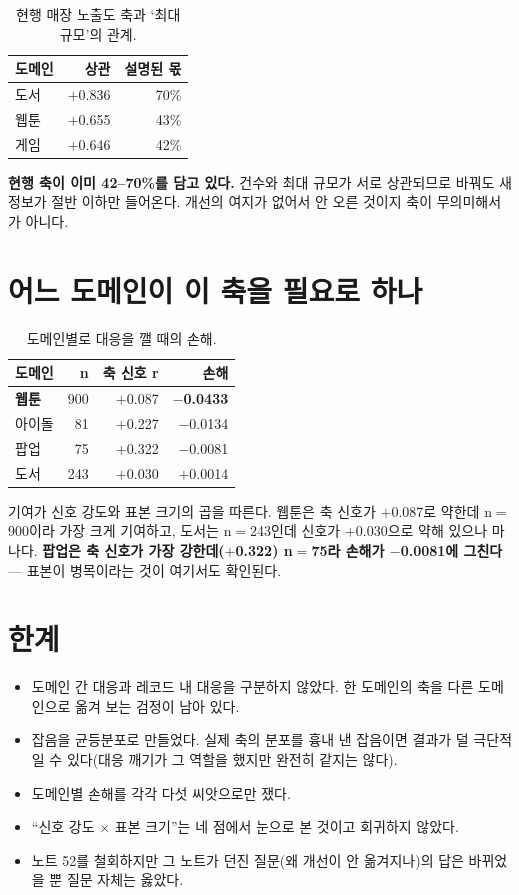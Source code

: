 \documentclass[10pt]{article}
\begin{document}
\begin{table}[t]
\centering\tsize
\caption{현행 매장 노출도 축과 `최대 규모'의 관계.}
\begin{tabular}{lrr}
\toprule
도메인 & 상관 & 설명된 몫 \\
\midrule
도서 & $+$0.836 & 70\% \\
웹툰 & $+$0.655 & 43\% \\
게임 & $+$0.646 & 42\% \\
\bottomrule
\end{tabular}
\end{table}

\textbf{현행 축이 이미 42--70\%를 담고 있다.} 건수와 최대 규모가 서로 상관되므로
바꿔도 새 정보가 절반 이하만 들어온다. 개선의 여지가 없어서 안 오른 것이지
축이 무의미해서가 아니다.

\section{어느 도메인이 이 축을 필요로 하나}

\begin{table}[t]
\centering\tsize
\caption{도메인별로 대응을 깰 때의 손해.}
\begin{tabular}{lrrr}
\toprule
도메인 & n & 축 신호 r & 손해 \\
\midrule
\textbf{웹툰} & 900 & $+$0.087 & \textbf{$-$0.0433} \\
아이돌 & 81 & $+$0.227 & $-$0.0134 \\
팝업 & 75 & $+$0.322 & $-$0.0081 \\
도서 & 243 & $+$0.030 & $+$0.0014 \\
\bottomrule
\end{tabular}
\end{table}

기여가 신호 강도와 표본 크기의 곱을 따른다. 웹툰은 축 신호가 $+$0.087로 약한데
n$=$900이라 가장 크게 기여하고, 도서는 n$=$243인데 신호가 $+$0.030으로 약해
있으나 마나다. \textbf{팝업은 축 신호가 가장 강한데($+$0.322) n$=$75라 손해가
$-$0.0081에 그친다} --- 표본이 병목이라는 것이 여기서도 확인된다.

\section{한계}

\begin{itemize}[leftmargin=1.1em,itemsep=0.15em]
\item 도메인 간 대응과 레코드 내 대응을 구분하지 않았다. 한 도메인의 축을 다른
      도메인으로 옮겨 보는 검정이 남아 있다.
\item 잡음을 균등분포로 만들었다. 실제 축의 분포를 흉내 낸 잡음이면 결과가
      덜 극단적일 수 있다(대응 깨기가 그 역할을 했지만 완전히 같지는 않다).
\item 도메인별 손해를 각각 다섯 씨앗으로만 쟀다.
\item ``신호 강도 $\times$ 표본 크기''는 네 점에서 눈으로 본 것이고 회귀하지
      않았다.
\item 노트 52를 철회하지만 그 노트가 던진 질문(왜 개선이 안 옮겨지나)의 답은
      바뀌었을 뿐 질문 자체는 옳았다.
\end{itemize}
\end{document}
